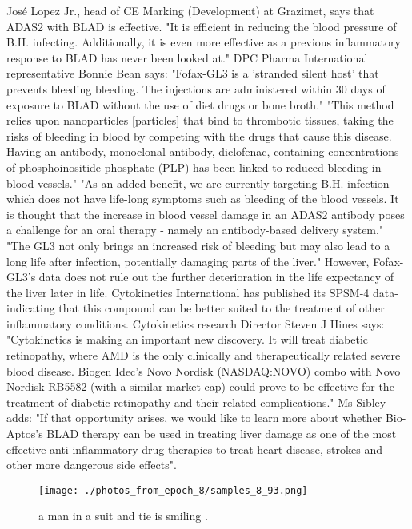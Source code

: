 \documentclass{article}%
\begin{document}
José Lopez Jr., head of CE Marking (Development) at Grazimet, says that ADAS2 with BLAD is effective. "It is efficient in reducing the blood pressure of B.H. infecting. Additionally, it is even more effective as a previous inflammatory response to BLAD has never been looked at."\newline%
DPC Pharma International representative Bonnie Bean says: "Fofax{-}GL3 is a 'stranded silent host' that prevents bleeding bleeding. The injections are administered within 30 days of exposure to BLAD without the use of diet drugs or bone broth."\newline%
"This method relies upon nanoparticles {[}particles{]} that bind to thrombotic tissues, taking the risks of bleeding in blood by competing with the drugs that cause this disease. Having an antibody, monoclonal antibody, diclofenac, containing concentrations of phosphoinositide phosphate (PLP) has been linked to reduced bleeding in blood vessels."\newline%
"As an added benefit, we are currently targeting B.H. infection which does not have life{-}long symptoms such as bleeding of the blood vessels. It is thought that the increase in blood vessel damage in an ADAS2 antibody poses a challenge for an oral therapy {-} namely an antibody{-}based delivery system."\newline%
"The GL3 not only brings an increased risk of bleeding but may also lead to a long life after infection, potentially damaging parts of the liver."\newline%
However, Fofax{-}GL3's data does not rule out the further deterioration in the life expectancy of the liver later in life.\newline%
Cytokinetics International has published its SPSM{-}4 data{-} indicating that this compound can be better suited to the treatment of other inflammatory conditions. Cytokinetics research Director Steven J Hines says: "Cytokinetics is making an important new discovery. It will treat diabetic retinopathy, where AMD is the only clinically and therapeutically related severe blood disease. Biogen Idec's Novo Nordisk (NASDAQ:NOVO) combo with Novo Nordisk RB5582 (with a similar market cap) could prove to be effective for the treatment of diabetic retinopathy and their related complications."\newline%
Ms Sibley adds: "If that opportunity arises, we would like to learn more about whether Bio{-}Aptos's BLAD therapy can be used in treating liver damage as one of the most effective anti{-}inflammatory drug therapies to treat heart disease, strokes and other more dangerous side effects".\newline%

%


\begin{figure}[h!]%
\centering%
\texttt{[image: ./photos\_from\_epoch\_8/samples\_8\_93.png]}%
\caption{a man in a suit and tie is smiling .}%
\end{figure}

%
\end{document}

